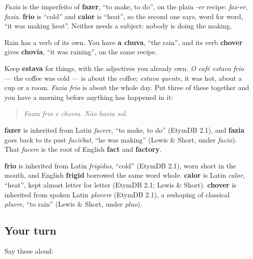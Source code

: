\emph{Fazia} is the imperfeito of \textbf{fazer}, \textquotedblleft{}to make, to do\textquotedblright{}, on the plain \emph{-er} recipe: \emph{faz-er}, \emph{fazia}. \textbf{frio} is \textquotedblleft{}cold\textquotedblright{} and \textbf{calor} is \textquotedblleft{}heat\textquotedblright{}, so the second one says, word for word, \textquotedblleft{}it was making heat\textquotedblright{}. Neither needs a subject: nobody is doing the making.

Rain has a verb of its own. You have \textbf{a chuva}, \textquotedblleft{}the rain\textquotedblright{}, and its verb \textbf{chover} gives \textbf{chovia}, \textquotedblleft{}it was raining\textquotedblright{}, on the same recipe.

Keep \textbf{estava} for things, with the adjectives you already own. \emph{O café estava frio} — the coffee was cold — is about the coffee; \emph{estava quente}, it was hot, about a cup or a room. \emph{Fazia frio} is about the whole day. Put three of these together and you have a morning before anything has happened in it:

\begin{quote}
\emph{Fazia frio e chovia. Não havia sol.}
\end{quote}

\begin{cousinweb}
\textbf{fazer} is inherited from Latin \emph{facere}, \textquotedblleft{}to make, to do\textquotedblright{} (EtymDB 2.1), and \textbf{fazia} goes back to its past \emph{faciēbat}, \textquotedblleft{}he was making\textquotedblright{} (Lewis \& Short, under \emph{facio}). That \emph{facere} is the root of English \textbf{fact} and \textbf{factory}.

\textbf{frio} is inherited from Latin \emph{frīgidus}, \textquotedblleft{}cold\textquotedblright{} (EtymDB 2.1), worn short in the mouth, and English \textbf{frigid} borrowed the same word whole. \textbf{calor} is Latin \emph{calor}, \textquotedblleft{}heat\textquotedblright{}, kept almost letter for letter (EtymDB 2.1; Lewis \& Short). \textbf{chover} is inherited from spoken Latin \emph{plovere} (EtymDB 2.1), a reshaping of classical \emph{pluere}, \textquotedblleft{}to rain\textquotedblright{} (Lewis \& Short, under \emph{pluo}).
\end{cousinweb}

\subsection*{Your turn}
Say these aloud:


